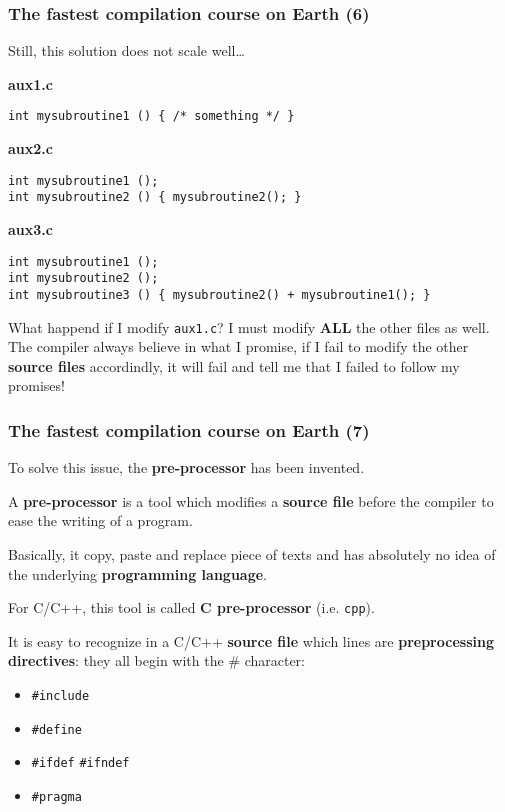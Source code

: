\documentclass[hyperref={pdfpagelabels=false}]{beamer}
\begin{document}
\begin{frame}[fragile]
\frametitle{The fastest compilation course on Earth (6)}

Still, this solution does not scale well\ldots

\textbf{aux1.c}
\begin{verbatim}
int mysubroutine1 () { /* something */ }
\end{verbatim}

\textbf{aux2.c}
\begin{verbatim}
int mysubroutine1 ();
int mysubroutine2 () { mysubroutine2(); }
\end{verbatim}

\textbf{aux3.c}
\begin{verbatim}
int mysubroutine1 ();
int mysubroutine2 ();
int mysubroutine3 () { mysubroutine2() + mysubroutine1(); }
\end{verbatim}


What happend if I modify \texttt{aux1.c}? I must modify \textbf{ALL}
the other files as well. The compiler always believe in what I
promise, if I fail to modify the other \textbf{source files}
accordindly, it will fail and tell me that I failed to follow my
promises!

\end{frame}



\begin{frame}[fragile]
\frametitle{The fastest compilation course on Earth (7)}

To solve this issue, the \textbf{pre-processor} has been invented.

\vspace{0.3cm}

A \textbf{pre-processor} is a tool which modifies a \textbf{source
  file} before the compiler to ease the writing of a program.

\vspace{0.3cm}

Basically, it copy, paste and replace piece of texts and has
absolutely no idea of the underlying \textbf{programming language}.

\vspace{0.3cm}

For C/C++, this tool is called \textbf{C pre-processor}
(i.e. \texttt{cpp}).

\vspace{0.3cm}

It is easy to recognize in a C/C++ \textbf{source file} which lines
are \textbf{preprocessing directives}: they all begin with the \#
character:

\begin{itemize}
\item \texttt{\#include}
\item \texttt{\#define}
\item \texttt{\#ifdef} \texttt{\#ifndef}
\item \texttt{\#pragma}
\end{itemize}
\end{frame}
\end{document}
